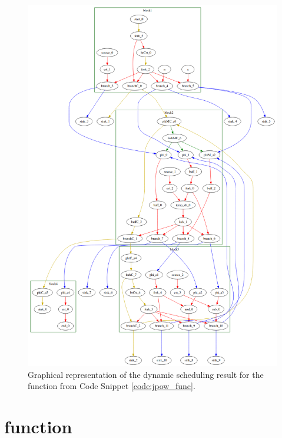 \begin{figure}[H]
    \centering
    \includegraphics[width=\textwidth]{Images/pow_dot.png}
    \caption{Graphical representation of the dynamic scheduling result for the  function from Code Snippet \ref{code:jpow_func}.}
    \label{fig:jpow_dot}
\end{figure}

\pagebreak

\section{ function}
\label{sec:nr}

